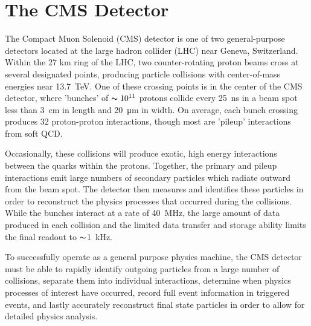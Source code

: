 \chapter{The CMS Detector}
\label{sec:detector}

The Compact Muon Solenoid (CMS) detector is one of two general-purpose detectors located at the large hadron collider (LHC) near Geneva, Switzerland. 
Within the 27 km ring of the LHC, two counter-rotating proton beams cross at several designated points, producing particle collisions with center-of-mass energies near \SI{13.7}{\tera\eV}. 
One of these crossing points is in the center of the CMS detector, where 'bunches' of $\thicksim10^{11}$ protons collide every \SI{25}{\nano\second} in a beam spot less than \SI{3}{\centi\meter} in length and \SI{20}{\micro\meter} in width. 
On average, each bunch crossing produces 32 proton-proton interactions, though most are 'pileup' interactions from soft QCD.

Occasionally, these collisions will produce exotic, high energy interactions between the quarks within the protons. 
Together, the primary and pileup interactions emit large numbers of secondary particles which radiate outward from the beam spot. 
The detector then measures and identifies these particles in order to reconstruct the physics processes that occurred during the collisions. 
While the bunches interact at a rate of \SI{40}{\mega\hertz}, the large amount of data produced in each collision and the limited data transfer and storage ability limits the final readout to $\thicksim$\SI{1}{\kilo\hertz}.

To successfully operate as a general purpose physics machine, the CMS detector must be able to rapidly identify outgoing particles from a large number of collisions, separate them into individual interactions, determine when physics processes of interest have occurred, record full event information in triggered events, and lastly accurately reconstruct final state particles in order to allow for detailed physics analysis. 

